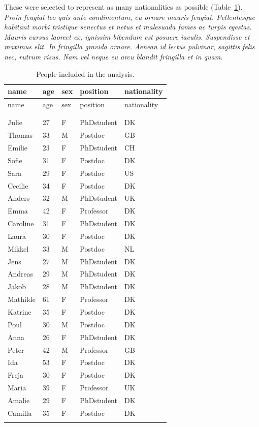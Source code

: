 \documentclass[
  a4paper,
]{scrbook}
\begin{document}
These were selected to represent as many nationalities as possible
(Table~\ref{tbl-subjects}). \emph{Proin feugiat leo quis ante
condimentum, eu ornare mauris feugiat. Pellentesque habitant morbi
tristique senectus et netus et malesuada fames ac turpis egestas. Mauris
cursus laoreet ex, ignissim bibendum est posuere iaculis. Suspendisse et
maximus elit. In fringilla gravida ornare. Aenean id lectus pulvinar,
sagittis felis nec, rutrum risus. Nam vel neque eu arcu blandit
fringilla et in quam.}

\begin{longtable}[]{@{}lllll@{}}

\toprule\noalign{}
name & age & sex & position & nationality \\
\midrule\noalign{}
\endfirsthead
\toprule\noalign{}
name & age & sex & position & nationality \\
\midrule\noalign{}
\endhead
\bottomrule\noalign{}
\tabularnewline
\caption{}\label{T_74e4e}\tabularnewline
\endlastfoot
Julie & 27 & F & PhDstudent & DK \\
Thomas & 33 & M & Postdoc & GB \\
Emilie & 23 & F & PhDstudent & CH \\
Sofie & 31 & F & Postdoc & DK \\
Sara & 29 & F & Postdoc & US \\
Cecilie & 34 & F & Postdoc & DK \\
Anders & 32 & M & PhDstudent & UK \\
Emma & 42 & F & Professor & DK \\
Caroline & 31 & F & PhDstudent & DK \\
Laura & 30 & F & Postdoc & DK \\
Mikkel & 33 & M & Postdoc & NL \\
Jens & 27 & M & PhDstudent & DK \\
Andreas & 29 & M & PhDstudent & DK \\
Jakob & 28 & M & PhDstudent & DK \\
Mathilde & 61 & F & Professor & DK \\
Katrine & 35 & F & Postdoc & DK \\
Poul & 30 & M & Postdoc & DK \\
Anna & 26 & F & PhDstudent & DK \\
Peter & 42 & M & Professor & GB \\
Ida & 53 & F & Postdoc & DK \\
Freja & 30 & F & Postdoc & DK \\
Maria & 39 & F & Professor & UK \\
Amalie & 29 & F & PhDstudent & DK \\
Camilla & 35 & F & Postdoc & DK \\


\caption{\label{tbl-subjects}People included in the analysis.}

\tabularnewline
\end{longtable}
\end{document}
